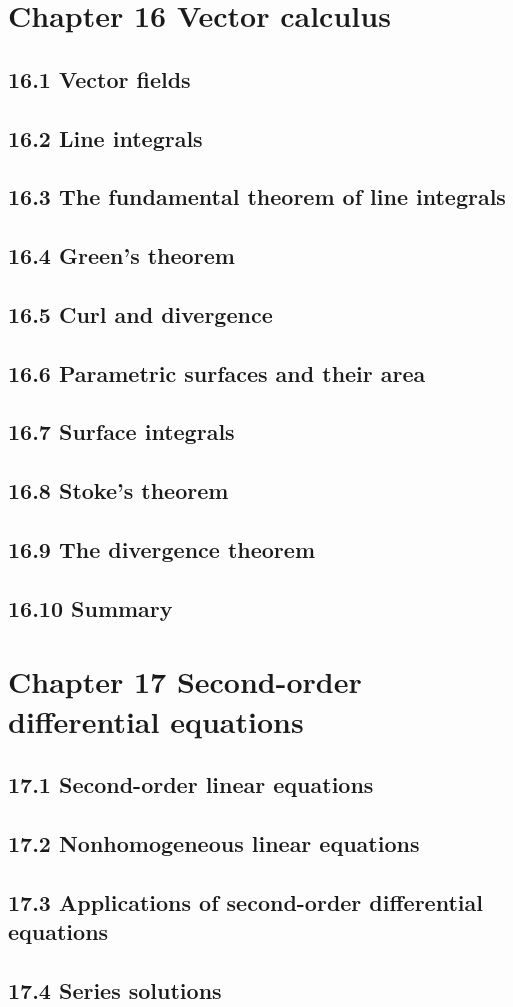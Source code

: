 \documentclass{article}
\begin{document}
\section{Chapter 16 Vector calculus}
\subsection{16.1 Vector fields}
\subsection{16.2 Line integrals}
\subsection{16.3 The fundamental theorem of line integrals}
\subsection{16.4 Green's theorem}
\subsection{16.5 Curl and divergence}
\subsection{16.6 Parametric surfaces and their area}
\subsection{16.7 Surface integrals}
\subsection{16.8 Stoke's theorem}
\subsection{16.9 The divergence theorem}
\subsection{16.10 Summary}

\section{Chapter 17 Second-order differential equations}
\subsection{17.1 Second-order linear equations}
\subsection{17.2 Nonhomogeneous linear equations}
\subsection{17.3 Applications of second-order differential equations}
\subsection{17.4 Series solutions}
\end{document}
